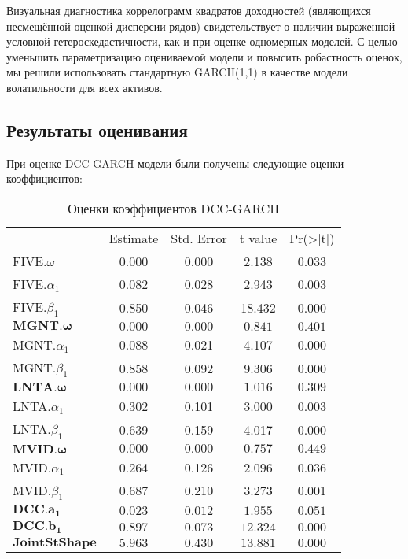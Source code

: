 \documentclass[a4paper,11pt]{article}
\begin{document}
Визуальная диагностика коррелограмм квадратов доходностей (являющихся несмещённой оценкой дисперсии рядов) свидетельствует о наличии выраженной условной гетероскедастичности, как и при оценке одномерных моделей. С целью уменьшить параметризацию оцениваемой модели и повысить робастность оценок, мы решили использовать стандартную GARCH(1,1) в качестве модели волатильности для всех активов.

\subsection{Результаты оценивания}\label{estimation}
При оценке DCC-GARCH модели были получены следующие оценки коэффициентов:
\begin{table}[htbp]
  \centering
  \captionsetup{font=large}
  \caption{Оценки коэффициентов DCC-GARCH}

    \begin{tabular}{lcccc}
        &  Estimate &  Std. Error &  t value & Pr(>|t|) \\
    FIVE.$\omega$ & 0.000 & 0.000 & 2.138 & 0.033 \\
    FIVE.$\alpha_1$ & 0.082 & 0.028 & 2.943 & 0.003 \\
    FIVE.$\beta_1$ & 0.850 & 0.046 & 18.432 & 0.000 \\
    $\mathbf{MGNT.\omega}$ & $\mathbf{0.000}$ & $\mathbf{0.000}$ & $\mathbf{0.841}$ & $\mathbf{0.401}$ \\
    MGNT.$\alpha_1$ & 0.088 & 0.021 & 4.107 & 0.000 \\
    MGNT.$\beta_1$ & 0.858 & 0.092 & 9.306 & 0.000 \\
    $\mathbf{LNTA.\omega}$ & $\mathbf{0.000}$ & $\mathbf{0.000}$ & $\mathbf{1.016}$ & $\mathbf{0.309}$ \\
    LNTA.$\alpha_1$ & 0.302 & 0.101 & 3.000 & 0.003 \\
    LNTA.$\beta_1$ & 0.639 & 0.159 & 4.017 & 0.000 \\
    $\mathbf{MVID.\omega}$ & $\mathbf{0.000}$ & $\mathbf{0.000}$ & $\mathbf{0.757}$ & $\mathbf{0.449}$ \\
    MVID.$\alpha_1$ & 0.264 & 0.126 & 2.096 & 0.036 \\
    MVID.$\beta_1$ & 0.687 & 0.210 & 3.273 & 0.001 \\
    $\mathbf{DCC.a_1}$ & $\mathbf{0.023}$ & $\mathbf{0.012}$ & $\mathbf{1.955}$ & $\mathbf{0.051}$ \\
    $\mathbf{DCC.b_1}$ & $\mathbf{0.897}$ & $\mathbf{0.073}$ & $\mathbf{12.324}$ & $\mathbf{0.000}$ \\
    $\mathbf{JointStShape}$ & $\mathbf{5.963}$ & $\mathbf{0.430}$ & $\mathbf{13.881}$ & $\mathbf{0.000}$ \\
    \end{tabular}%
  \label{tab:addlabel}%
\end{table}%
\end{document}
